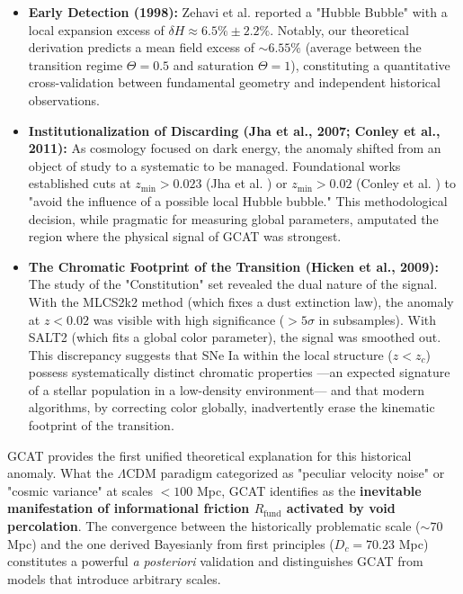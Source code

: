 \documentclass[12pt, a4paper]{article}
\theoremstyle{plain}
\theoremstyle{definition}
\begin{document}
\begin{itemize}
    \item \textbf{Early Detection (1998):} Zehavi et al. \cite{Zehavi1998} reported a "Hubble Bubble" with a local expansion excess of $\delta H \approx 6.5\% \pm 2.2\%$. Notably, our theoretical derivation predicts a mean field excess of $\sim 6.55\%$ (average between the transition regime $\Theta=0.5$ and saturation $\Theta=1$), constituting a quantitative cross-validation between fundamental geometry and independent historical observations.
    
    \item \textbf{Institutionalization of Discarding (Jha et al., 2007; Conley et al., 2011):} As cosmology focused on dark energy, the anomaly shifted from an object of study to a systematic to be managed. Foundational works established cuts at $z_{\text{min}} > 0.023$ (Jha et al. \cite{Jha2007}) or $z_{\text{min}} > 0.02$ (Conley et al. \cite{Conley2011}) to "avoid the influence of a possible local Hubble bubble." This methodological decision, while pragmatic for measuring global parameters, amputated the region where the physical signal of GCAT was strongest.
    
    \item \textbf{The Chromatic Footprint of the Transition (Hicken et al., 2009):} The study of the "Constitution" set \cite{Hicken2009} revealed the dual nature of the signal. With the MLCS2k2 method (which fixes a dust extinction law), the anomaly at $z < 0.02$ was visible with high significance ($>5\sigma$ in subsamples). With SALT2 (which fits a global color parameter), the signal was smoothed out. This discrepancy suggests that SNe Ia within the local structure ($z < z_c$) possess systematically distinct chromatic properties —an expected signature of a stellar population in a low-density environment— and that modern algorithms, by correcting color globally, inadvertently erase the kinematic footprint of the transition.
\end{itemize}

GCAT provides the first unified theoretical explanation for this historical anomaly. What the $\Lambda$CDM paradigm categorized as "peculiar velocity noise" or "cosmic variance" at scales $<100$ Mpc, GCAT identifies as the \textbf{inevitable manifestation of informational friction $R_{\text{fund}}$ activated by void percolation}. The convergence between the historically problematic scale ($\sim 70$ Mpc) and the one derived Bayesianly from first principles ($D_c = 70.23$ Mpc) constitutes a powerful \textit{a posteriori} validation and distinguishes GCAT from models that introduce arbitrary scales.
\end{document}
